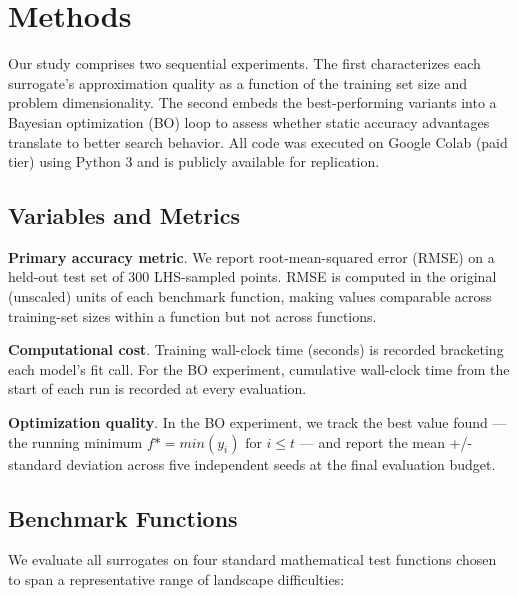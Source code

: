 \documentclass[sigconf,nonacm]{acmart}
\begin{document}
\section{Methods}

Our study comprises two sequential experiments. The first characterizes each surrogate's approximation quality as a function of the training set size and problem dimensionality. The second embeds the best-performing variants into a Bayesian optimization (BO) loop to assess whether static accuracy advantages translate to better search behavior. All code was executed on Google Colab (paid tier) using Python 3 and is publicly available for replication.

\subsection{Variables and Metrics}

\textbf{Primary accuracy metric}.  We report root-mean-squared error (RMSE) on a held-out test set of 300 LHS-sampled points. RMSE is computed in the original (unscaled) units of each benchmark function, making values comparable across training-set sizes within a function but not across functions.

\textbf{Computational cost}.  Training wall-clock time (seconds) is recorded bracketing each model's fit call. For the BO experiment, cumulative wall-clock time from the start of each run is recorded at every evaluation.

\textbf{Optimization quality}.  In the BO experiment, we track the best value found — the running minimum $f\text{*} = min(y_i) \text{ for } i \le t$ — and report the mean +/- standard deviation across five independent seeds at the final evaluation budget.

\subsection{Benchmark Functions}

We evaluate all surrogates on four standard mathematical test functions chosen to span a representative range of landscape difficulties:
\end{document}
